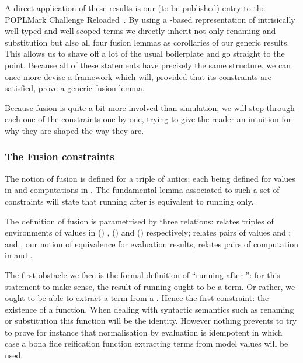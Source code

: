 A direct application of these results is our (to be published) entry to the
POPLMark Challenge Reloaded~\citeyear{poplmarkreloaded}. By using a -based
representation of intrisically well-typed and well-scoped terms we directly inherit
not only renaming and substitution but also all four fusion lemmas as corollaries
of our generic results. This allows us to shave off a lot of the usual boilerplate
and go straight to the point.
Because all of these statements have precisely the same structure, we can
once more devise a framework which will, provided that its constraints are
satisfied, prove a generic fusion lemma.

Because fusion is quite a bit more involved than simulation, we will step through
each one of the constraints one by one, trying to give the reader an intuition
for why they are shaped the way they are.

\subsubsection{The Fusion constraints}

The notion of fusion is defined for a triple of antics; each 
being defined for values in  and computations in . The
fundamental lemma associated to such a set of constraints will state that
running  after  is equivalent to running  only.

The definition of fusion is parametrised by three relations:  relates
triples of environments of values in {(\Gamma {})  \Delta},
{(\Delta {})  \Theta} and {(\Gamma {})  \Theta}
respectively;  relates pairs of values and ;
and , our notion of equivalence for evaluation results, relates pairs
of computation in  and .


The first obstacle we face is the formal definition of ``running 
after '': for this statement to make sense, the result of running
 ought to be a term. Or rather, we ought to be able to extract a
term from a . Hence the first constraint: the existence of a 
function. When dealing with syntactic semantics such as renaming or substitution
this function will be the identity. However nothing prevents to try to prove for
instance that normalisation by evaluation is idempotent in which case a bona fide
reification function extracting terms from model values will be used.

